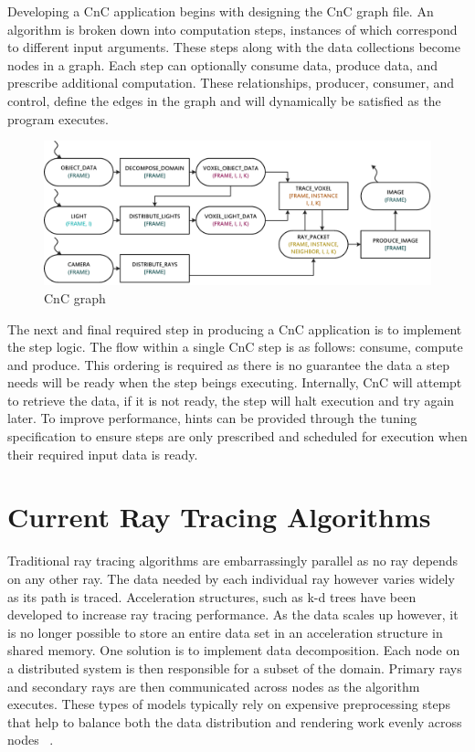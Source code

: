 \documentclass{vgtc}                          %
\begin{document}
Developing a CnC application begins with designing the CnC graph file.  An algorithm is broken down into computation steps, instances of which correspond to different input arguments.  These steps along with the data collections become nodes in a graph.  Each step can optionally consume data, produce data, and prescribe additional computation.  These relationships, producer, consumer, and control, define the edges in the graph and will dynamically be satisfied as the program executes.

\begin{figure}[!htb]
  \centering
  \includegraphics[width=\textwidth]{drawings/CnC.pdf}
  \caption{CnC graph}
  \label{fig:cnc}
\end{figure}

The next and final required step in producing a CnC application is to implement the step logic.  The flow within a single CnC step is as follows: consume, compute and produce.  This ordering is required as there is no guarantee the data a step needs will be ready when the step beings executing.  Internally, CnC will attempt to retrieve the data, if it is not ready, the step will halt execution and try again later.  To improve performance, hints can be provided through the tuning specification to ensure steps are only prescribed and scheduled for execution when their required input data is ready.

\section{Current Ray Tracing Algorithms}

Traditional ray tracing algorithms are embarrassingly parallel as no ray depends on any other ray.  The data needed by each individual ray however varies widely as its path is traced.   Acceleration structures, such as k-d trees have been developed to increase ray tracing performance.  As the data scales up however, it is no longer possible to store an entire data set in an acceleration structure in shared memory.  One solution is to implement data decomposition.  Each node on a distributed system is then responsible for a subset of the domain.   Primary rays and secondary rays are then communicated across nodes as the algorithm executes.  These types of models typically rely on expensive preprocessing steps that help to balance both the data distribution and rendering work evenly across nodes ~\cite{navratil2014dynamic}. 
\end{document}
